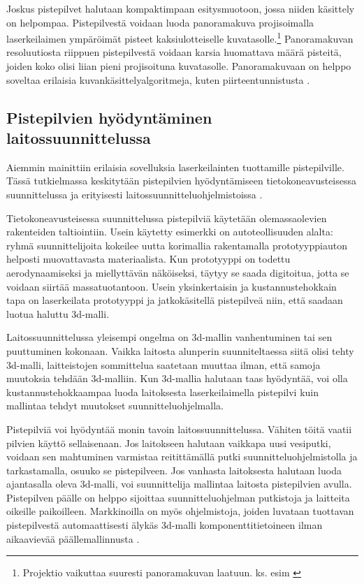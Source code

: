 Joskus pistepilvet halutaan kompaktimpaan esitysmuotoon, jossa niiden käsittely on helpompaa. Pistepilvestä voidaan luoda panoramakuva projisoimalla laserkeilaimen ympäröimät pisteet kaksiulotteiselle kuvatasolle.\footnote{Projektio vaikuttaa suuresti panoramakuvan laatuun. ks. esim \cite{proj}} Panoramakuvan resoluutiosta riippuen pistepilvestä voidaan karsia huomattava määrä pisteitä, joiden koko olisi liian pieni projisoituna kuvatasolle. Panoramakuvaan on helppo soveltaa erilaisia kuvankäsittelyalgoritmeja, kuten piirteentunnistusta . 

\subsection{Pistepilvien hyödyntäminen laitossuunnittelussa}

Aiemmin mainittiin erilaisia sovelluksia laserkeilainten tuottamille pistepilville. Tässä tutkielmassa keskitytään pistepilvien hyödyntämiseen tietokoneavusteisessa suunnittelussa  ja erityisesti laitossuunnitteluohjelmistoissa .

Tietokoneavusteisessa suunnittelussa pistepilviä käytetään olemassaolevien rakenteiden taltiointiin. Usein käytetty esimerkki on autoteollisuuden alalta: ryhmä suunnittelijoita kokeilee uutta korimallia rakentamalla prototyyppiauton helposti muovattavasta materiaalista. Kun prototyyppi on todettu aerodynaamiseksi ja miellyttävän näköiseksi, täytyy se saada digitoitua, jotta se voidaan siirtää massatuotantoon. Usein yksinkertaisin ja kustannustehokkain tapa on laserkeilata prototyyppi ja jatkokäsitellä pistepilveä niin, että saadaan luotua haluttu 3d-malli.

Laitossuunnittelussa yleisempi ongelma on 3d-mallin vanhentuminen tai sen puuttuminen kokonaan. Vaikka laitosta alunperin suunniteltaessa siitä olisi tehty 3d-malli, laitteistojen sommittelua saatetaan muuttaa ilman, että samoja muutoksia tehdään 3d-malliin. Kun 3d-mallia halutaan taas hyödyntää, voi olla kustannustehokkaampaa luoda laitoksesta laserkeilaimella pistepilvi kuin mallintaa tehdyt muutokset suunnitteluohjelmalla. \cite{Piipponen}

Pistepilviä voi hyödyntää monin tavoin laitossuunnittelussa. Vähiten töitä vaatii pilvien käyttö sellaisenaan. Jos laitokseen halutaan vaikkapa uusi vesiputki, voidaan sen mahtuminen varmistaa reitittämällä putki suunnitteluohjelmistolla ja tarkastamalla, osuuko se pistepilveen. Jos vanhasta laitoksesta halutaan luoda ajantasalla oleva 3d-malli, voi suunnittelija mallintaa laitosta pistepilvien avulla. Pistepilven päälle on helppo sijoittaa suunnitteluohjelman putkistoja ja laitteita oikeille paikoilleen. Markkinoilla on myös ohjelmistoja, joiden luvataan tuottavan pistepilvestä automaattisesti älykäs 3d-malli komponenttitietoineen ilman aikaavievää päällemallinnusta \cite{aveva}.



